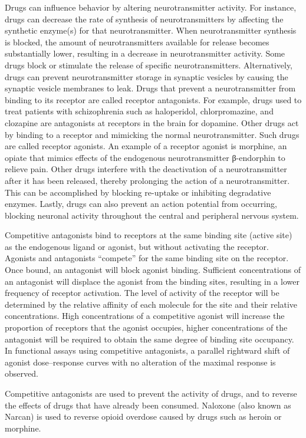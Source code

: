 Drugs can influence behavior by altering neurotransmitter activity. For instance, drugs can decrease the rate of synthesis of neurotransmitters by affecting the synthetic enzyme(s) for that neurotransmitter. When neurotransmitter synthesis is blocked, the amount of neurotransmitters available for release becomes substantially lower, resulting in a decrease in neurotransmitter activity. Some drugs block or stimulate the release of specific neurotransmitters. Alternatively, drugs can prevent neurotransmitter storage in synaptic vesicles by causing the synaptic vesicle membranes to leak. Drugs that prevent a neurotransmitter from binding to its receptor are called receptor antagonists. For example, drugs used to treat patients with schizophrenia such as haloperidol, chlorpromazine, and clozapine are antagonists at receptors in the brain for dopamine. Other drugs act by binding to a receptor and mimicking the normal neurotransmitter. Such drugs are called receptor agonists. An example of a receptor agonist is morphine, an opiate that mimics effects of the endogenous neurotransmitter β-endorphin to relieve pain. Other drugs interfere with the deactivation of a neurotransmitter after it has been released, thereby prolonging the action of a neurotransmitter. This can be accomplished by blocking re-uptake or inhibiting degradative enzymes. Lastly, drugs can also prevent an action potential from occurring, blocking neuronal activity throughout the central and peripheral nervous system.

Competitive antagonists bind to receptors at the same binding site (active site) as the endogenous ligand or agonist, but without activating the receptor. Agonists and antagonists ``compete'' for the same binding site on the receptor. Once bound, an antagonist will block agonist binding. Sufficient concentrations of an antagonist will displace the agonist from the binding sites, resulting in a lower frequency of receptor activation. The level of activity of the receptor will be determined by the relative affinity of each molecule for the site and their relative concentrations. High concentrations of a competitive agonist will increase the proportion of receptors that the agonist occupies, higher concentrations of the antagonist will be required to obtain the same degree of binding site occupancy. In functional assays using competitive antagonists, a parallel rightward shift of agonist dose--response curves with no alteration of the maximal response is observed.

Competitive antagonists are used to prevent the activity of drugs, and to reverse the effects of drugs that have already been consumed. Naloxone (also known as Narcan) is used to reverse opioid overdose caused by drugs such as heroin or morphine.

